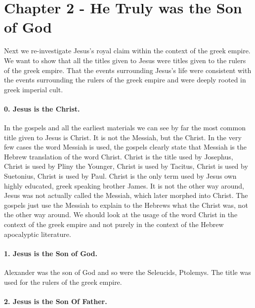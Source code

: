 \section{Chapter 2 - He Truly was the Son of God}\label{sec:chapter-2---he-truly-was-the-son-of-god}

Next we re-investigate Jesus's royal claim within the context of the greek empire.
We want to show that all the titles given to Jesus were titles given to the rulers of the greek empire.
That the events surrounding Jesus's life were consistent with the events surrounding the rulers of the greek empire and were deeply rooted in greek imperial cult.

\paragraph{0.
Jesus is the Christ.}\label{par:jesus-is-the-christ.}

In the gospels and all the earliest materials we can see by far the most common title given to Jesus is Christ.
It is not the Messiah, but the Christ.
In the very few cases the word Messiah is used, the gospels clearly state that Messiah is the Hebrew translation of the word Christ.
Christ is the title used by Josephus, Christ is used by Pliny the Younger, Christ is used by Tacitus, Christ is used by Suetonius, Christ is used by Paul.
Christ is the only term used by Jesus own highly educated, greek speaking brother James.
It is not the other way around, Jesus was not actually called the Messiah, which later morphed into Christ.
The gospels just use the Messiah to explain to the Hebrews what the Christ was, not the other way around.
We should look at the usage of the word Christ in the context of the greek empire and not purely in the context of the Hebrew apocalyptic literature.

\paragraph{1.
Jesus is the Son of God.}\label{par:jesus-is-the-son-of-god.}

Alexander was the son of God and so were the Seleucids, Ptolemys.
The title was used for the rulers of the greek empire.

\paragraph{2.
Jesus is the Son Of Father.}\label{par:jesus-is-the-son-of-father.}

